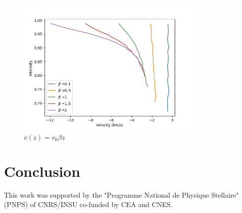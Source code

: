 \documentclass{/Users/art2/TeX/aanda/aa}
\begin{document}
\begin{figure}
   \includegraphics[width=0.8\textwidth]{Bisectors_accel.png}
   \caption{ }
   \caption{$v(z)=v_0\beta z$}
   \label{bisector2}
   \end{figure}

\section{Conclusion}


\begin{acknowledgements}
This work was supported by the "Programme National de Physique Stellaire" (PNPS) of CNRS/INSU co-funded by CEA and CNES.
\end{acknowledgements}


%



 
\end{document}
